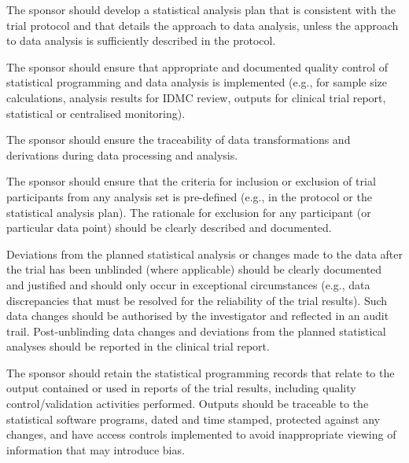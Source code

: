 \documentclass[11pt]{article}
\begin{document}
\begin{description}[leftmargin=2.5cm,style=sameline]

\item[(a)] The sponsor should develop a statistical analysis plan that is consistent with the trial protocol and that details the approach to data analysis, unless the approach to data analysis is sufficiently described in the protocol.

\item[(b)] The sponsor should ensure that appropriate and documented quality control of statistical programming and data analysis is implemented (e.g., for sample size calculations, analysis results for IDMC review, outputs for clinical trial report, statistical or centralised monitoring).

\item[(c)] The sponsor should ensure the traceability of data transformations and derivations during data processing and analysis.

\item[(d)] The sponsor should ensure that the criteria for inclusion or exclusion of trial participants from any analysis set is pre-defined (e.g., in the protocol or the statistical analysis plan). The rationale for exclusion for any participant (or particular data point) should be clearly described and documented.

\item[(e)] Deviations from the planned statistical analysis or changes made to the data after the trial has been unblinded (where applicable) should be clearly documented and justified and should only occur in exceptional circumstances (e.g., data discrepancies that must be resolved for the reliability of the trial results). Such data changes should be authorised by the investigator and reflected in an audit trail. Post-unblinding data changes and deviations from the planned statistical analyses should be reported in the clinical trial report.

\item[(f)] The sponsor should retain the statistical programming records that relate to the output contained or used in reports of the trial results, including quality control/validation activities performed. Outputs should be traceable to the statistical software programs, dated and time stamped, protected against any changes, and have access controls implemented to avoid inappropriate viewing of information that may introduce bias.

\end{description}
\end{document}
